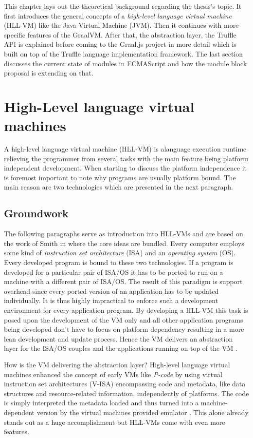 This chapter lays out the theoretical background regarding the thesis's topic. It first introduces the general concepts of a \emph{high-level language virtual machine} (HLL-VM) like the Java Virtual Machine (JVM). Then it continues with more specific features of the GraalVM. After that, the abstraction layer, the Truffle API is explained before coming to the Graal.js project in more detail which is built on top of the Truffle language implementation framework. The last section discusses the current state of modules in ECMAScript and how the module block proposal is extending on that.

\section{High-Level language virtual machines}
A high-level language virtual machine (HLL-VM) is alanguage execution runtime relieving the programmer from several tasks with the main feature being platform independent development. When starting to discuss the platform independence it is foremost important to note why programs are usually platform bound. The main reason are two technologies which are presented in the next paragraph.

\subsection{Groundwork}
The following paragraphs serve as introduction into HLL-VMs and are based on the work of Smith in \cite{Smith} where the core ideas are bundled. Every computer employs some kind of \emph{instruction set architecture} (ISA) and an \emph{operating system} (OS). Every developed program is bound to these two technologies. If a program is developed for a particular pair of ISA/OS it has to be ported to run on a machine with a different pair of ISA/OS. The result of this paradigm is support overhead since every ported version of an application has to be updated individually. It is thus highly impractical to enforce such a development environment for every application program. By developing a HLL-VM this task is posed upon the development of the VM only and all other application programs being developed don't have to focus on platform dependency resulting in a more lean development and update process. Hence the VM delivers an abstraction layer for the ISA/OS couples and the applications running on top of the VM \cite{Smith}. 

How is the VM delivering the abstraction layer? High-level language virtual machines enhanced the concept of early VMs like \emph{P-code} \cite{pCode} by using virtual instruction set architectures (V-ISA) encompassing code and metadata, like data structures and resource-related information, independently of platforms. The code is simply interpreted the metadata loaded and thus turned into a machine-dependent version by the virtual machines provided emulator \cite{Smith}. This alone already stands out as a huge accomplishment but HLL-VMs come with even more features.

